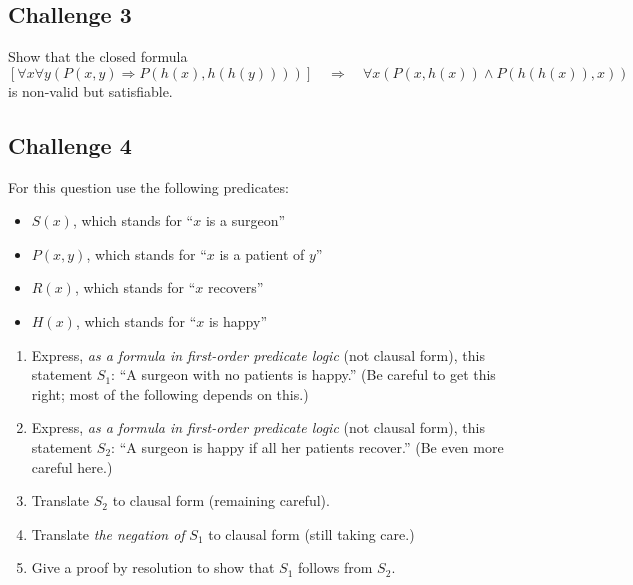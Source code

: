 \documentclass[12pt]{article}
\newcommand{\impl}{\mathbin{\Rightarrow}}
\begin{document}
\subsection*{Challenge 3}
Show that the closed formula
\[
  \left[ \forall x \forall y (P(x,y) \impl P(h(x),h(h(y)))) \right]
        \quad \impl \quad \forall x (P(x,h(x)) \land P(h(h(x)),x))
\]
is non-valid but satisfiable.

\subsection*{Challenge 4}
For this question use the following predicates:
\begin{itemize}
\item
$S(x)$, which stands for ``$x$ is a surgeon''
\item
$P(x,y)$, which stands for ``$x$ is a patient of $y$''
\item
$R(x)$, which stands for ``$x$ recovers''
\item
$H(x)$, which stands for ``$x$ is happy''
\end{itemize}
\begin{enumerate}
\item
Express, \emph{as a formula in first-order predicate logic}
(not clausal form), this statement $S_1$:
``A surgeon with no patients is happy.''
(Be careful to get this right; most of the following depends
on this.)
\item
Express, \emph{as a formula in first-order predicate logic}
(not clausal form), this statement $S_2$:
``A surgeon is happy if all her patients recover.''
(Be even more careful here.)
\item
Translate $S_2$ to clausal form (remaining careful).
\item
Translate \emph{the negation of} $S_1$ to clausal form
(still taking care.)
\item
Give a proof by resolution to show that $S_1$ follows from $S_2$.
\end{enumerate}
\end{document}
